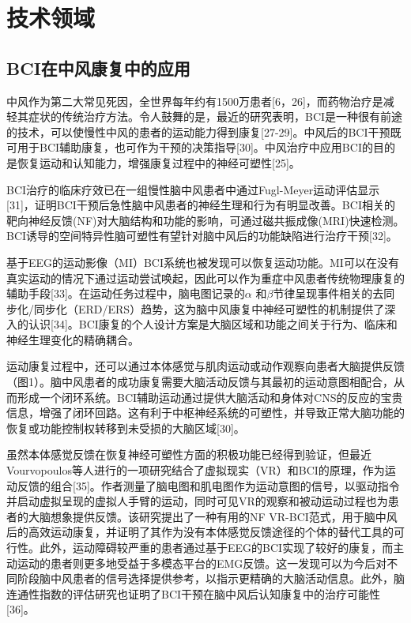 \documentclass[UTF8,a4paper]{ctexart}
\begin{document}
\section{技术领域}
\subsection{BCI在中风康复中的应用}
中风作为第二大常见死因，全世界每年约有1500万患者[6，26]，而药物治疗是减轻其症状的传统治疗方法。令人鼓舞的是，最近的研究表明，BCI是一种很有前途的技术，可以使慢性中风的患者的运动能力得到康复[27-29]。中风后的BCI干预既可用于BCI辅助康复，也可作为干预的决策指导[30]。中风治疗中应用BCI的目的是恢复运动和认知能力，增强康复过程中的神经可塑性[25]。
\par
BCI治疗的临床疗效已在一组慢性脑中风患者中通过Fugl-Meyer运动评估显示[31]，证明BCI干预后急性脑中风患者的神经生理和行为有明显改善。BCI相关的靶向神经反馈(NF)对大脑结构和功能的影响，可通过磁共振成像(MRI)快速检测。BCI诱导的空间特异性脑可塑性有望针对脑中风后的功能缺陷进行治疗干预[32]。
\par
基于EEG的运动影像（MI）BCI系统也被发现可以恢复运动功能。MI可以在没有真实运动的情况下通过运动尝试唤起，因此可以作为重症中风患者传统物理康复的辅助手段[33]。在运动任务过程中，脑电图记录的$\alpha$ 和$\beta$节律呈现事件相关的去同步化/同步化（ERD/ERS）趋势，这为脑中风康复中神经可塑性的机制提供了深入的认识[34]。BCI康复的个人设计方案是大脑区域和功能之间关于行为、临床和神经生理变化的精确耦合。
\par
运动康复过程中，还可以通过本体感觉与肌肉运动或动作观察向患者大脑提供反馈（图1）。脑中风患者的成功康复需要大脑活动反馈与其最初的运动意图相配合，从而形成一个闭环系统。BCI辅助运动通过提供大脑活动和身体对CNS的反应的宝贵信息，增强了闭环回路。这有利于中枢神经系统的可塑性，并导致正常大脑功能的恢复或功能控制权转移到未受损的大脑区域[30]。
\par
虽然本体感觉反馈在恢复神经可塑性方面的积极功能已经得到验证，但最近Vourvopoulos等人进行的一项研究结合了虚拟现实（VR）和BCI的原理，作为运动反馈的组合[35]。作者测量了脑电图和肌电图作为运动意图的信号，以驱动指令并启动虚拟呈现的虚拟人手臂的运动，同时可见VR的观察和被动运动过程也为患者的大脑想象提供反馈。该研究提出了一种有用的NF VR-BCI范式，用于脑中风后的高效运动康复，并证明了其作为没有本体感觉反馈途径的个体的替代工具的可行性。此外，运动障碍较严重的患者通过基于EEG的BCI实现了较好的康复，而主动运动的患者则更多地受益于多模态平台的EMG反馈。这一发现可以为今后对不同阶段脑中风患者的信号选择提供参考，以指示更精确的大脑活动信息。此外，脑连通性指数的评估研究也证明了BCI干预在脑中风后认知康复中的治疗可能性[36]。
\end{document}

